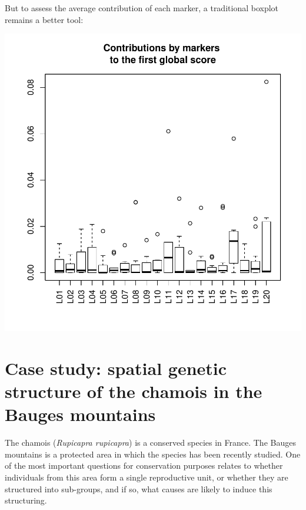 \documentclass{article}
\begin{document}
But to assess the average contribution of each marker, a traditional
boxplot remains a better tool:
\begin{Schunk}
\end{Schunk}
\includegraphics{figs/spca-boxplot}











\section{Case study: spatial genetic structure of the chamois in the Bauges mountains}
The chamois (\textit{Rupicapra rupicapra}) is a conserved species in France.
The Bauges mountains is a protected area in which the species has been
recently studied.
One of the most important questions for conservation purposes relates to whether individuals
from this area form a single reproductive unit, or whether they
are structured into sub-groups, and if so, what causes are likely to
induce this structuring.
\end{document}
